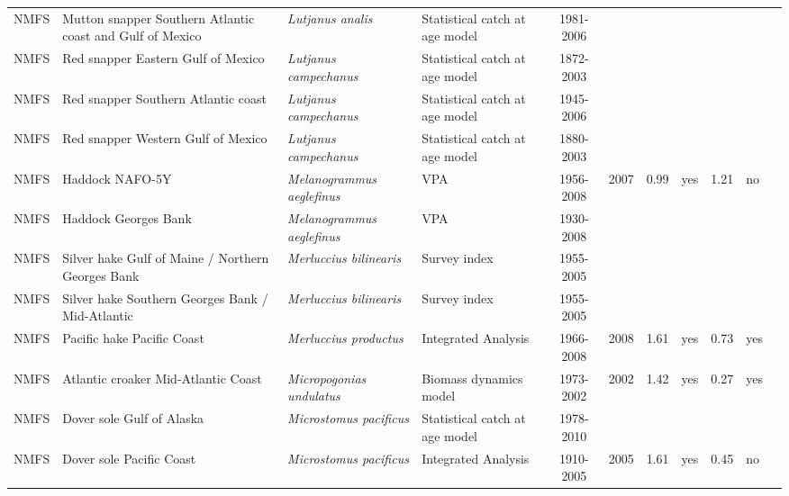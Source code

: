 \begin{longtable}{p{1.8cm}p{3.5cm}p{3.5cm}p{3cm}cccp{0.9cm}cp{0.9cm}c}
  NMFS & Mutton snapper Southern Atlantic coast and Gulf of Mexico & \textit{Lutjanus analis} & Statistical catch at age model & 1981-2006 &  &  &  &  &  & \cite{JENSEN_MUTSNAPSATLCGM_2008.pdf} \\ 
  NMFS & Red snapper Eastern Gulf of Mexico & \textit{Lutjanus campechanus} & Statistical catch at age model & 1872-2003 &  &  &  &  &  & \cite{RedSnapper-SEDAR-2008.pdf} \\ 
  NMFS & Red snapper Southern Atlantic coast & \textit{Lutjanus campechanus} & Statistical catch at age model & 1945-2006 &  &  &  &  &  & \cite{JENSEN_RSNAPSATLC_2008.pdf} \\ 
  NMFS & Red snapper Western Gulf of Mexico & \textit{Lutjanus campechanus} & Statistical catch at age model & 1880-2003 &  &  &  &  &  & \cite{RedSnapper-SEDAR-2008.pdf} \\ 
  NMFS & Haddock NAFO-5Y & \textit{Melanogrammus aeglefinus} & VPA & 1956-2008 & 2007 & 0.99 & yes & 1.21 & no & \cite{NMFS-GOM-Melanogrammusaeglefinus-2008.pdf} \\ 
  NMFS & Haddock Georges Bank & \textit{Melanogrammus aeglefinus} & VPA & 1930-2008 &  &  &  &  &  & \cite{NMFS-5Z-Melanogrammusaeglefinus-2008.pdf} \\ 
  NMFS & Silver hake Gulf of Maine / Northern Georges Bank & \textit{Merluccius bilinearis} & Survey index & 1955-2005 &  &  &  &  &  & \cite{SilverHake-2005-NEFSC-Assessment.pdf} \\ 
  NMFS & Silver hake Southern Georges Bank / Mid-Atlantic & \textit{Merluccius bilinearis} & Survey index & 1955-2005 &  &  &  &  &  & \cite{SilverHake-2005-NEFSC-Assessment.pdf} \\ 
  NMFS & Pacific hake Pacific Coast & \textit{Merluccius productus} & Integrated Analysis & 1966-2008 & 2008 & 1.61 & yes & 0.73 & yes & \cite{NWFSC-PHAKEPCOAST-2008-Pacific-Hake-US-Canada.pdf} \\ 
  NMFS & Atlantic croaker Mid-Atlantic Coast & \textit{Micropogonias undulatus} & Biomass dynamics model & 1973-2002 & 2002 & 1.42 & yes & 0.27 & yes & \cite{2004_ASMFC_AtlCroak.pdf} \\ 
  NMFS & Dover sole Gulf of Alaska & \textit{Microstomus pacificus} & Statistical catch at age model & 1978-2010 &  &  &  &  &  & \cite{2007_SAFE_GOAdeepflat.pdf} \\ 
  NMFS & Dover sole Pacific Coast & \textit{Microstomus pacificus} & Integrated Analysis & 1910-2005 & 2005 & 1.61 & yes & 0.45 & no & \cite{2005-SAFE-WCdover.pdf} \\ 

\end{longtable}
